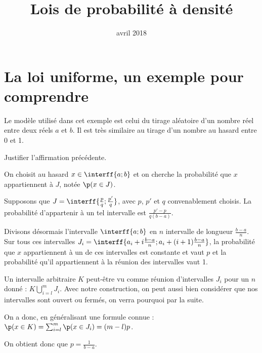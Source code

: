 \documentclass[11pt,a4paper,french]{article}
\title{Lois de probabilité à densité}
\author{\bsc{Jumel}}
\date{avril 2018}
\begin{document}
\maketitle

\bigskip

\section{La loi uniforme, un exemple pour comprendre}

Le modèle utilisé dans cet exemple est celui du tirage aléatoire d'un
nombre réel entre deux réels $a$ et $b$. Il est très similaire au tirage
d'un nombre au hasard entre 0 et 1.

\begin{exercice}
  Justifier l'affirmation précédente.
\end{exercice}


On choisit au hasard $x \in \interff{a;b}$ et on cherche la probabilité
que $x$ appartiennent à $J$, notée $\p(x\in J)$.

Supposons que $J = \interff{\frac{p}q ; \frac{p'}q}$, avec $p$, $p'$ et
$q$ convenablement choisis. La probabilité d'appartenir à un tel
intervalle est $\frac{p' - p}{q(b-a)}$.

Divisons désormais l'intervalle $\interff{a;b}$ en $n$ intervalle de
longueur $\frac{b-a}n$. Sur tous ces intervalles $J_i = \interff{a_i +
i\frac{b-a}n ; a_i + (i+1)\frac{b-a}n}$, la probabilité que $x$
appartiennent à un de ces intervalles est constante et vaut $p$ et
la probabilité qu'il appartiennent à la réunion des intervalles vaut 1.

Un intervalle arbitraire $K$ peut-être vu comme réunion d'intervalles
$J_i$ pour un $n$ donné : $K \bigcup_{i = l}^m J_i$. Avec notre
construction, on peut aussi bien considérer que nos intervalles sont
ouvert ou fermés, on verra pourquoi par la suite.

On a donc, en généralisant une formule connue : $\p(x\in K) =
\sum_{i=l}^m \p(x\in J_i) = (m -l)p$.

On obtient donc que $p = \frac1{b-a}$.
\end{document}
